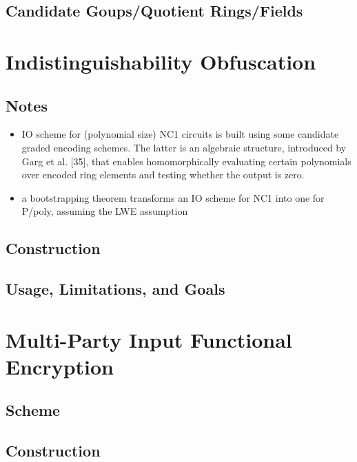 \documentclass[12pt,twoside]{reedthesis}
\begin{document}
    
    
    
    \section{Candidate Goups/Quotient Rings/Fields}
    
    
    
    \chapter{Indistinguishability Obfuscation}
    
    
    \section{Notes}
    
    \begin{itemize}
     \item IO scheme for (polynomial size) NC1 circuits is built using some candidate graded encoding schemes. The latter is an algebraic structure, introduced by Garg et al. [35], that enables homomorphically evaluating certain polynomials over encoded ring elements and testing whether the output is zero.
     
     \item a bootstrapping theorem transforms an IO scheme for NC1 into one for P/poly, assuming the LWE assumption
     
     
    
    \end{itemize}
    
    \section{Construction}
    \section{Usage, Limitations, and Goals}
    
    
    
    
    \chapter{Multi-Party Input Functional Encryption}
    \section{Scheme}
    \section{Construction}
\end{document}
